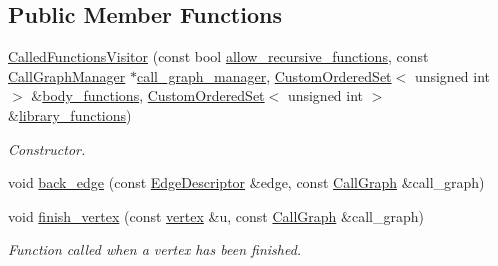 \subsection*{Public Member Functions}
\begin{DoxyCompactItemize}
\item 
\hyperlink{structCalledFunctionsVisitor_a8c3cc576a9dbbd23428f3d95c08a2723}{Called\+Functions\+Visitor} (const bool \hyperlink{structCalledFunctionsVisitor_adacde9fcc83c0f8944a62e307b706a12}{allow\+\_\+recursive\+\_\+functions}, const \hyperlink{classCallGraphManager}{Call\+Graph\+Manager} $\ast$\hyperlink{structCalledFunctionsVisitor_a1b3c58fef5ca0bcf71281c9b721d46fa}{call\+\_\+graph\+\_\+manager}, \hyperlink{classCustomOrderedSet}{Custom\+Ordered\+Set}$<$ unsigned int $>$ \&\hyperlink{structCalledFunctionsVisitor_a247b847cc5d88746e63c54d0297048d3}{body\+\_\+functions}, \hyperlink{classCustomOrderedSet}{Custom\+Ordered\+Set}$<$ unsigned int $>$ \&\hyperlink{structCalledFunctionsVisitor_ad67878eadef3ee07427510ce4c8e8aaf}{library\+\_\+functions})
\begin{DoxyCompactList}\small\item\em Constructor. \end{DoxyCompactList}\item 
void \hyperlink{structCalledFunctionsVisitor_a686b4650c2dd295bad0d73ba7aa6cae9}{back\+\_\+edge} (const \hyperlink{graph_8hpp_a9eb9afea34e09f484b21f2efd263dd48}{Edge\+Descriptor} \&edge, const \hyperlink{classCallGraph}{Call\+Graph} \&call\+\_\+graph)
\item 
void \hyperlink{structCalledFunctionsVisitor_a641abe95937af8e1d2fbafcc5b27a098}{finish\+\_\+vertex} (const \hyperlink{graph_8hpp_abefdcf0544e601805af44eca032cca14}{vertex} \&u, const \hyperlink{classCallGraph}{Call\+Graph} \&call\+\_\+graph)
\begin{DoxyCompactList}\small\item\em Function called when a vertex has been finished. \end{DoxyCompactList}\end{DoxyCompactItemize}
